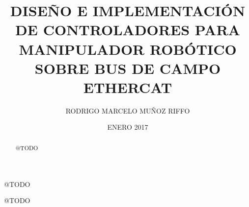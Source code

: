 \documentclass[upright, contnum]{umemoria}
\author{RODRIGO MARCELO MUÑOZ RIFFO}
\title{DISEÑO E IMPLEMENTACIÓN DE CONTROLADORES PARA MANIPULADOR ROBÓTICO SOBRE BUS DE CAMPO ETHERCAT}
\date{ENERO 2017}
\begin{document}
\frontmatter
\maketitle

\begin{abstract}
@TODO
\end{abstract}

\begin{dedicatoria}
@TODO
\end{dedicatoria}

\begin{thanks}
@TODO
\end{thanks}

\cleardoublepage
\tableofcontents
\cleardoublepage
\listoftables
\cleardoublepage
\listoffigures

\mainmatter









\nocite{*}


\end{document}
